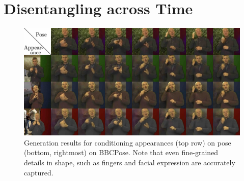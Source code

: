 \section{Disentangling across Time}\label{sec:videotovideo}
	\begin{figure}[htp]
		\centering
		\includegraphics[trim={0cm 0cm 0cm 0cm},clip, width=1.\linewidth]{fig/factor/bbc_arrange}
		\caption{Generation results for conditioning appearances (top row) on pose (bottom, rightmost) on BBCPose.
		Note that even fine-grained details in shape, such as fingers and facial expression are accurately captured.}
		\label{fig:bbcthumb}
	\end{figure}



